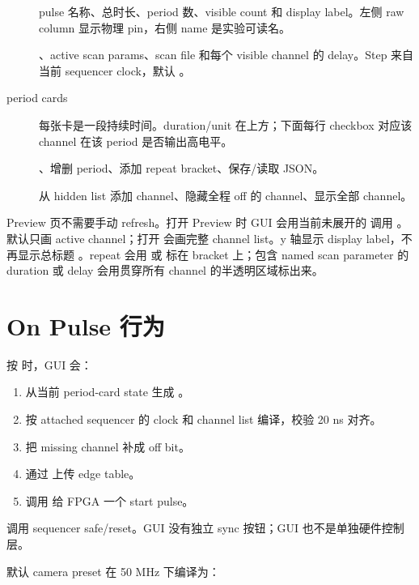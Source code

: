 \documentclass[11pt,oneside,openany]{book}
\begin{document}
\begin{description}
  \item[] pulse 名称、总时长、period 数、visible count 和 display label。左侧 raw column 显示物理 pin，右侧 name 是实验可读名。
  \item[] 、active scan params、scan file 和每个 visible channel 的 delay。Step 来自当前 sequencer clock，默认 。
  \item[period cards] 每张卡是一段持续时间。duration/unit 在上方；下面每行 checkbox 对应该 channel 在该 period 是否输出高电平。
  \item[] 、增删 period、添加 repeat bracket、保存/读取 JSON。
  \item[] 从 hidden list 添加 channel、隐藏全程 off 的 channel、显示全部 channel。
\end{description}

Preview 页不需要手动 refresh。打开 Preview 时 GUI 会用当前未展开的  调用 。默认只画 active channel；打开  会画完整 channel list。y 轴显示 display label，不再显示总标题 。repeat 会用  或  标在 bracket 上；包含 named scan parameter 的 duration 或 delay 会用贯穿所有 channel 的半透明区域标出来。

\section{On Pulse 行为}
按  时，GUI 会：

\begin{enumerate}
  \item 从当前 period-card state 生成 。
  \item 按 attached sequencer 的 clock 和 channel list 编译，校验 20 ns 对齐。
  \item 把 missing channel 补成 off bit。
  \item 通过  上传 edge table。
  \item 调用  给 FPGA 一个 start pulse。
\end{enumerate}

 调用 sequencer safe/reset。GUI 没有独立 sync 按钮；GUI 也不是单独硬件控制层。

默认 camera preset 在 50 MHz 下编译为：
\end{document}
